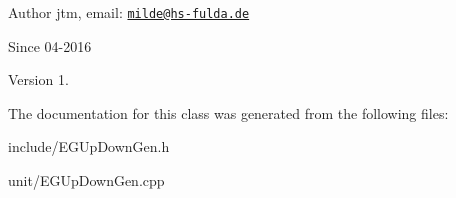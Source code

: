 \begin{DoxyAuthor}{Author}
jtm, email\-:  \href{mailto:milde@hs-fulda.de}{\tt milde@hs-\/fulda.\-de} 
\end{DoxyAuthor}
\begin{DoxySince}{Since}
04-\/2016 
\end{DoxySince}
\begin{DoxyVersion}{Version}
1. 
\end{DoxyVersion}


The documentation for this class was generated from the following files\-:\begin{DoxyCompactItemize}
\item 
include/E\-G\-Up\-Down\-Gen.\-h\item 
unit/E\-G\-Up\-Down\-Gen.\-cpp\end{DoxyCompactItemize}
